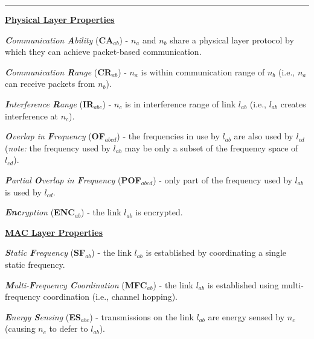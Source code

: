 \bigskip
\hrule
\bigskip

\smallskip
\noindent \underline{\textbf{Physical Layer Properties}}
\squishlist

	\item \emph{\textbf{C}ommunication \textbf{A}bility} (\textbf{CA}$_{ab}$) - $n_a$ and $n_b$ share a physical layer protocol by which they can achieve packet-based communication.

	\item \emph{\textbf{C}ommunication \textbf{R}ange} (\textbf{CR}$_{ab}$) - $n_a$ is within communication range of $n_b$ (i.e., $n_a$ can receive packets from $n_b$).

	\item \emph{\textbf{I}nterference \textbf{R}ange} (\textbf{IR}$_{abc}$) - $n_c$ is in interference range of link $l_{ab}$ (i.e., $l_{ab}$ creates interference at $n_c$).
	
	\item \emph{\textbf{O}verlap in \textbf{F}requency} (\textbf{OF}$_{abcd}$) - the frequencies in use by $l_{ab}$ are also used by $l_{cd}$ (\emph{note:} the frequency used by $l_{ab}$ may be only a subset of the frequency space of $l_{cd}$).
	
	\item \emph{\textbf{P}artial \textbf{O}verlap in \textbf{F}requency} (\textbf{POF}$_{abcd}$) - only part of the frequency used by $l_{ab}$ is used by $l_{cd}$.

	\item \emph{\textbf{Enc}ryption} (\textbf{ENC}$_{ab}$) - the link $l_{ab}$ is encrypted.  

\squishend

\smallskip
\noindent \underline{\textbf{MAC Layer Properties}}
\squishlist

	\item \emph{\textbf{S}tatic \textbf{F}requency} (\textbf{SF}$_{ab}$) - the link $l_{ab}$ is established by coordinating a single static frequency.

	\item \emph{\textbf{M}ulti-\textbf{F}requency \textbf{C}oordination} (\textbf{MFC}$_{ab}$) - the link $l_{ab}$ is established using multi-frequency coordination (i.e., channel hopping).
	
	\item \emph{\textbf{E}nergy \textbf{S}ensing} (\textbf{ES}$_{abc}$) - transmissions on the link $l_{ab}$ are energy sensed by $n_c$ (causing $n_c$ to defer to $l_{ab}$). 
	
